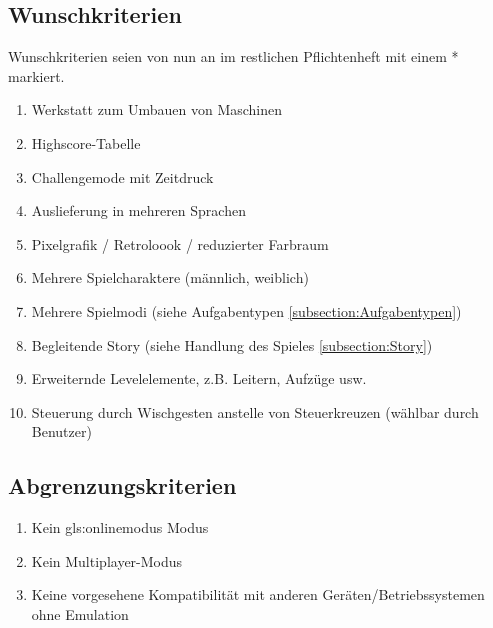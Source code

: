 \documentclass{scrartcl}
\begin{document}
\subsection{Wunschkriterien}
Wunschkriterien seien von nun an im restlichen Pflichtenheft mit einem * markiert.

\begin{enumerate}
	\item \label{wunsch:werkstatt}Werkstatt zum Umbauen von Maschinen
	\item \label{wunsch:highscore}Highscore-Tabelle
	\item \label{wunsch:challengemode}Challengemode mit Zeitdruck
	\item \label{wunsch:multilang}Auslieferung in mehreren Sprachen
	\item \label{wunsch:8bit}Pixelgrafik / Retroloook / reduzierter Farbraum
	\item \label{wunsch:multiplechar}Mehrere Spielcharaktere (männlich, weiblich)
	\item \label{wunsch:multiplemode}Mehrere Spielmodi (siehe Aufgabentypen \ref{subsection:Aufgabentypen})
    \item \label{wunsch:story}Begleitende Story (siehe Handlung des Spieles \ref{subsection:Story})
    \item \label{wunsch:erweiterndeLevelelemente}Erweiternde Levelelemente, z.B. Leitern, Aufzüge usw.
    \item \label{wunsch:wischgesten} Steuerung durch Wischgesten anstelle von Steuerkreuzen (wählbar durch Benutzer)
\end{enumerate}

\subsection{Abgrenzungskriterien}

\begin{enumerate}
	\item \label{abgrenz:online}Kein \gls{gls:onlinemodus} Modus
	\item \label{abgrenz:multiplayer}Kein Multiplayer-Modus
	\item \label{abgrenz:emu}Keine vorgesehene Kompatibilität mit anderen Geräten/Betriebssystemen ohne Emulation
\end{enumerate}

\clearpage
\end{document}
